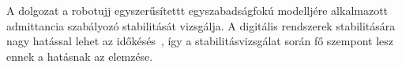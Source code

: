 A dolgozat a robotujj egyszerűsítettt egyszabadságfokú modelljére alkalmazott admittancia szabályozó stabilitását vizsgálja.
A digitális rendszerek stabilitására nagy hatással lehet az időkésés~\citep{stepan1989retarded,stepan2001vibrations}, így a 
stabilitásvizsgálat során fő szempont lesz ennek a hatásnak az elemzése.


    
    

